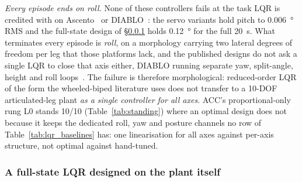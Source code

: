\documentclass{jcd}
\begin{document}
\emph{Every episode ends on roll.} None of these controllers fails at the
task LQR is credited with on Ascento~\citep{klemm2019ascento} or
DIABLO~\citep{diablo2024}: the servo variants hold pitch to
\SI{0.006}{\degree} RMS and the full-state design of
\S\ref{sec:full_state_lqr} holds \SI{0.12}{\degree} for the full
\SI{20}{s}. What terminates every episode is \emph{roll}, on a morphology
carrying two lateral degrees of freedom per leg that those platforms lack, and the published designs do not ask a single LQR to close that axis either, DIABLO
running separate yaw, split-angle, height and roll loops~\citep{diablo2024}.
The failure is therefore morphological:
reduced-order LQR of the form the wheeled-biped literature uses does not
transfer to a 10-DOF articulated-leg plant \emph{as a single controller for all
axes}. ACC's proportional-only rung L0 stands \num{10}/\num{10}
(Table~\ref{tab:standing}) where an optimal design does not because it keeps the
dedicated roll, yaw and posture channels no row of
Table~\ref{tab:lqr_baselines} has: one linearisation for all axes against
per-axis structure, not optimal against hand-tuned.

\subsubsection{A full-state LQR designed on the plant itself}
\label{sec:full_state_lqr}
\end{document}
